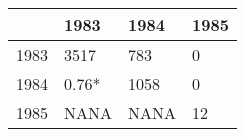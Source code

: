 \begin{table}[ht]
\centering
\begin{tabular}{rlll}
  \hline
 & 1983 & 1984 & 1985 \\ 
  \hline
1983 & 3517 & 783 & 0 \\ 
  1984 &  0.76*  & 1058 & 0 \\ 
  1985 &    NANA &    NANA & 12 \\ 
   \hline
\end{tabular}
\end{table}
